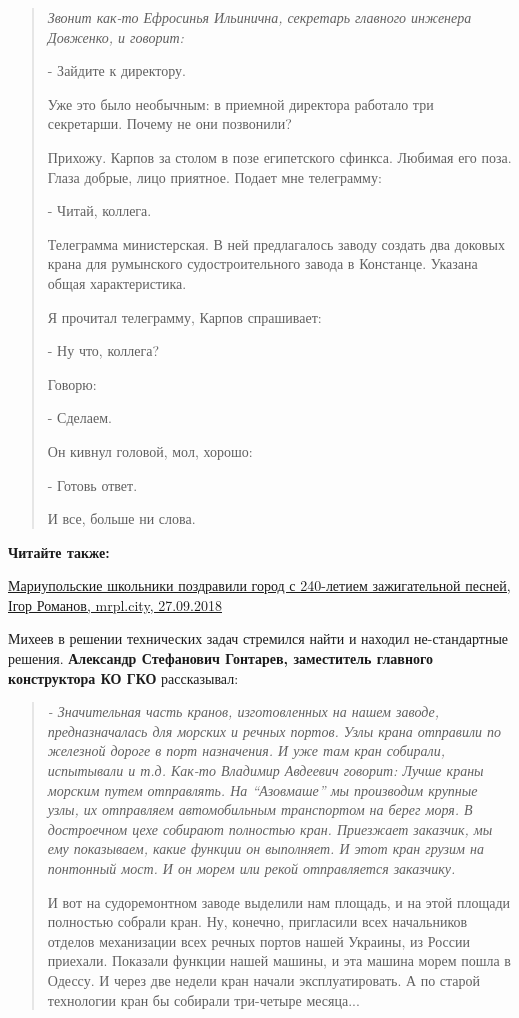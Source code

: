 \begin{quote}
\em
Звонит как-то Ефросинья Ильинична, секретарь главного инженера Довженко, и
говорит:

- Зайдите к директору.

Уже это было необычным: в приемной директора работало три секретарши. Почему не
они позвонили?

Прихожу. Карпов за столом в позе египетского сфинкса. Любимая его поза. Глаза
добрые, лицо приятное. Подает мне телеграмму:

- Читай, коллега.

Телеграмма министерская. В ней предлагалось заводу создать два доковых крана
для румынского судостроительного завода в Констанце. Указана общая
характеристика.

Я прочитал телеграмму, Карпов спрашивает:

- Ну что, коллега?

Говорю:

- Сделаем.

Он кивнул головой, мол, хорошо:

- Готовь ответ.

И все, больше ни слова.
\end{quote}


\textbf{Читайте также:} 

\href{https://mrpl.city/news/view/mariupolskie-shkolniki-pozdravili-gorod-s-240-letiem-zazhigatelnoj-pesnej-video}{%
Мариупольские школьники поздравили город с 240-летием зажигательной песней, Ігор Романов, mrpl.city, 27.09.2018}

Михеев в решении технических задач стремился найти и находил не\hyp{}стандартные
решения. \textbf{Александр Стефанович Гонтарев, заместитель главного конструктора КО
ГКО} рассказывал:

\begin{quote}
\em
- Значительная часть кранов, изготовленных на нашем заводе, предназначалась для
морских и речных портов. Узлы крана отправили по железной дороге в порт
назначения. И уже там кран собирали, испытывали и т.д. Как-то Владимир Авдеевич
говорит: Лучше краны морским путем отправлять. На \enquote{Азовмаше} мы производим
крупные узлы, их отправляем автомобильным транспортом на берег моря. В
достроечном цехе собирают полностью кран. Приезжает заказчик, мы ему
показываем, какие функции он выполняет. И этот кран грузим на понтонный мост. И
он морем или рекой отправляется заказчику.

И вот на судоремонтном заводе выделили нам площадь, и на этой площади полностью
собрали кран. Ну, конечно, пригласили всех начальников отделов механизации всех
речных портов нашей Украины, из России приехали. Показали функции нашей машины,
и эта машина морем пошла в Одессу. И через две недели кран начали
эксплуатировать. А по старой технологии кран бы собирали три-четыре месяца...
	
\end{quote}

